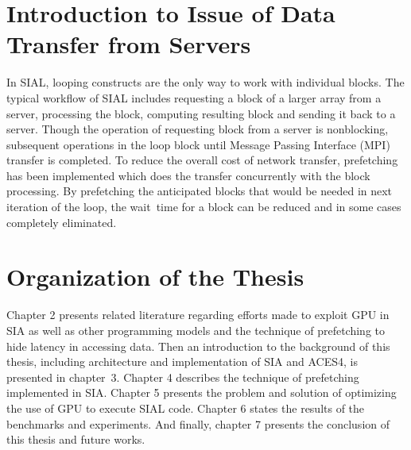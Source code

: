 \section{Introduction to Issue of Data Transfer from Servers}
In SIAL, looping constructs are the only way to work with individual blocks.
The typical workflow of SIAL includes requesting a block of a larger array from a server,
processing the block, computing resulting block and sending it back to a server. Though
the operation of requesting block from a server is nonblocking, subsequent operations
in the loop block until Message Passing Interface (MPI) transfer is completed. To reduce the overall cost of network
transfer, prefetching has been implemented which does the transfer concurrently
with the block processing. By prefetching the anticipated blocks that would be
needed in next iteration of the loop, the wait~time for a block can be reduced and
in some cases completely eliminated.

\section{Organization of the Thesis}
Chapter 2 presents related literature regarding efforts made to exploit GPU in
SIA as well as other programming models and the technique of prefetching to hide
latency in accessing data. Then an introduction to the background of this thesis,
including architecture and implementation of SIA and ACES4, is presented in chapter~3.
Chapter 4 describes the technique of prefetching implemented in SIA. Chapter 5
presents the problem and solution of optimizing the use of GPU to execute SIAL
code. Chapter 6 states the results of the benchmarks and experiments. And
finally, chapter 7 presents the conclusion of this thesis and future works.